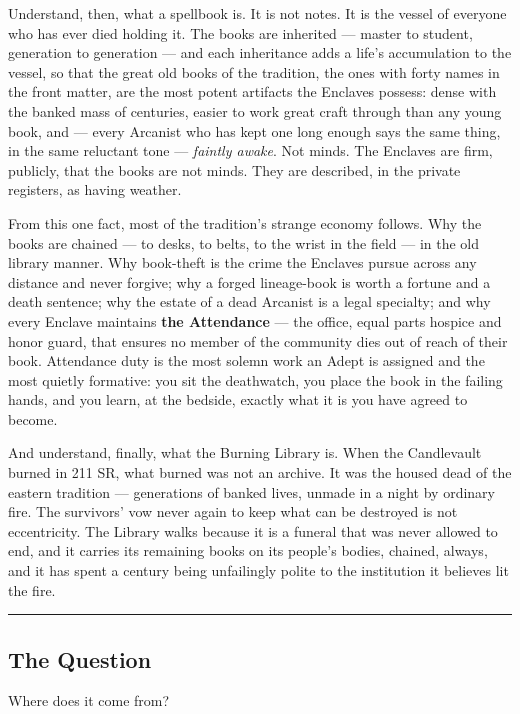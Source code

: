 Understand, then, what a spellbook is. It is not notes. It is the vessel of everyone who has ever died holding it. The books are inherited --- master to student, generation to generation --- and each inheritance adds a life's accumulation to the vessel, so that the great old books of the tradition, the ones with forty names in the front matter, are the most potent artifacts the Enclaves possess: dense with the banked mass of centuries, easier to work great craft through than any young book, and --- every Arcanist who has kept one long enough says the same thing, in the same reluctant tone --- \textit{faintly awake}. Not minds. The Enclaves are firm, publicly, that the books are not minds. They are described, in the private registers, as having weather.

From this one fact, most of the tradition's strange economy follows. Why the books are chained --- to desks, to belts, to the wrist in the field --- in the old library manner. Why book-theft is the crime the Enclaves pursue across any distance and never forgive; why a forged lineage-book is worth a fortune and a death sentence; why the estate of a dead Arcanist is a legal specialty; and why every Enclave maintains \textbf{the Attendance} --- the office, equal parts hospice and honor guard, that ensures no member of the community dies out of reach of their book. Attendance duty is the most solemn work an Adept is assigned and the most quietly formative: you sit the deathwatch, you place the book in the failing hands, and you learn, at the bedside, exactly what it is you have agreed to become.

And understand, finally, what the Burning Library is. When the Candlevault burned in 211 SR, what burned was not an archive. It was the housed dead of the eastern tradition --- generations of banked lives, unmade in a night by ordinary fire. The survivors' vow never again to keep what can be destroyed is not eccentricity. The Library walks because it is a funeral that was never allowed to end, and it carries its remaining books on its people's bodies, chained, always, and it has spent a century being unfailingly polite to the institution it believes lit the fire.

\medskip\hrule\medskip

\subsection{The Question}

Where does it come from?

